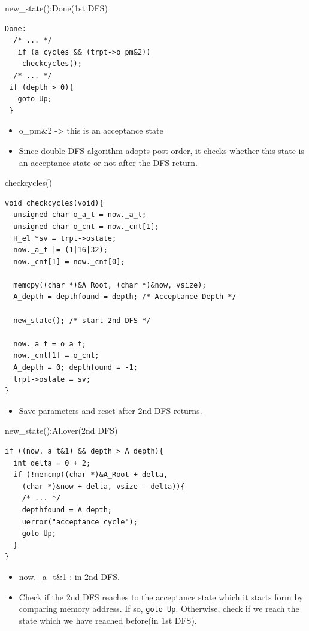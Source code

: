 \documentclass[12pt]{beamer}
\newcommand{\code}[1]{\texttt{#1}}
\begin{document}
\begin{frame}[fragile]{new\_state():Done(1st DFS)}
\begin{lstlisting}[basicstyle=\normalsize\ttfamily]
Done:
  /* ... */
   if (a_cycles && (trpt->o_pm&2))
    checkcycles();
  /* ... */
 if (depth > 0){
   goto Up;
 }
\end{lstlisting}
\begin{itemize}
	\item o\_pm\&2  -> this is an acceptance state
	\item Since double DFS algorithm adopts post-order, it checks whether this state is an acceptance state or not after the DFS return. 
\end{itemize}
\end{frame}

\begin{frame}[fragile]{checkcycles()}
\begin{lstlisting}[basicstyle=\footnotesize\ttfamily]
void checkcycles(void){
  unsigned char o_a_t = now._a_t;
  unsigned char o_cnt = now._cnt[1];
  H_el *sv = trpt->ostate;
  now._a_t |= (1|16|32);
  now._cnt[1] = now._cnt[0];

  memcpy((char *)&A_Root, (char *)&now, vsize);
  A_depth = depthfound = depth; /* Acceptance Depth */

  new_state(); /* start 2nd DFS */

  now._a_t = o_a_t;
  now._cnt[1] = o_cnt;
  A_depth = 0; depthfound = -1;
  trpt->ostate = sv;
}
\end{lstlisting}
\begin{itemize}
	\item Save parameters and reset after 2nd DFS returns.
\end{itemize}
\end{frame}

\begin{frame}[fragile]{new\_state():Allover(2nd DFS)}
\begin{lstlisting}[basicstyle=\footnotesize\ttfamily]
if ((now._a_t&1) && depth > A_depth){
  int delta = 0 + 2;
  if (!memcmp((char *)&A_Root + delta,
    (char *)&now + delta, vsize - delta)){
    /* ... */
    depthfound = A_depth;
    uerror("acceptance cycle");
    goto Up;
  }
}
\end{lstlisting}
\begin{itemize}
	\item now.\_a\_t\&1 : in 2nd DFS.
	\item Check if the 2nd DFS reaches to the acceptance state which it starts form by comparing memory address. If so, \code{goto Up}. Otherwise, check if we reach the state which we have reached before(in 1st DFS).
\end{itemize}
\end{frame}
\end{document}
